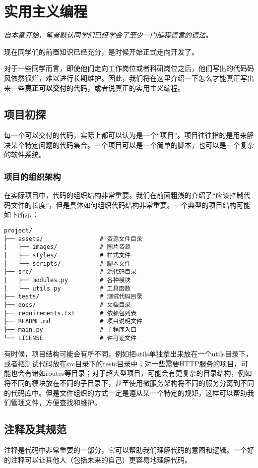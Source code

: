 \documentclass[../main.tex]{subfiles}
\begin{document}
\chapter{实用主义编程}

\begin{flushright}
    \emph{自本章开始，笔者默认同学们已经学会了至少一门编程语言的语法。}
\end{flushright}

现在同学们的前置知识已经充分，是时候开始正式走向开发了。

对于一些同学而言，即使他们走向工作岗位或者科研岗位之后，他们写出的代码码风依然很烂，难以进行长期维护。因此，我们将在这里介绍一下怎么才能真正写出来一些\textbf{真正可以交付}的代码，或者说真正的实用主义编程。

\section{项目初探}

每一个可以交付的代码，实际上都可以认为是一个“项目”。项目往往指的是用来解决某个特定问题的代码集合。一个项目可以是一个简单的脚本，也可以是一个复杂的软件系统。

\subsection{项目的组织架构}

在实际项目中，代码的组织结构非常重要。我们在前面粗浅的介绍了“应该控制代码文件的长度”，但是具体如何组织代码结构非常重要。一个典型的项目结构可能如下所示：
\begin{verbatim}
project/
├── assets/                # 资源文件目录
│   ├── images/            # 图片资源
│   ├── styles/            # 样式文件
│   └── scripts/           # 脚本文件
├── src/                   # 源代码目录
│   ├── modules.py         # 各种模块
│   └── utils.py           # 工具函数
├── tests/                 # 测试代码目录
├── docs/                  # 文档目录
├── requirements.txt       # 依赖包列表
├── README.md              # 项目说明文件
├── main.py                # 主程序入口
└── LICENSE                # 许可证文件

\end{verbatim}

有时候，项目结构可能会有所不同，例如把utils单独拿出来放在一个utils目录下，或者把测试代码放在src目录下的tests目录中；对一些需要HTTP服务的项目，可能也会有诸如routes等目录；对于超大型项目，可能会有更复杂的目录结构，例如将不同的模块放在不同的子目录下，甚至使用微服务架构将不同的服务分离到不同的代码库中。但是文件组织的方式一定是遵从某一个特定的规矩，这样可以帮助我们管理文件，方便查找和维护。

\section{注释及其规范}

注释是代码中非常重要的一部分，它可以帮助我们理解代码的意图和逻辑。一个好的注释可以让其他人（包括未来的自己）更容易地理解代码。
\end{document}
